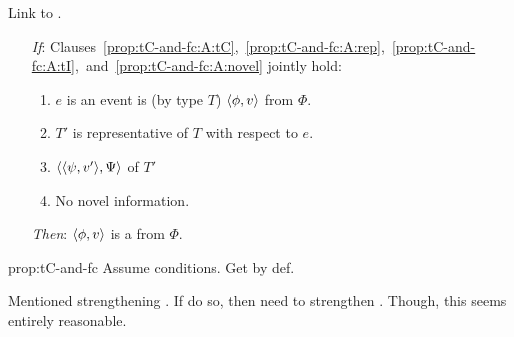 \begin{note}
  Link \tC{} to .

  \begin{proposition}[\tC{2} and \fc{1}]
    \label{prop:tC-and-fc}

    \noindent%

    \begin{itemize}
    \item[\emph{If}:]
      Clauses~\ref{prop:tC-and-fc:A:tC},~\ref{prop:tC-and-fc:A:rep},~\ref{prop:tC-and-fc:A:tI},~and~\ref{prop:tC-and-fc:A:novel} jointly hold:
      \begin{enumerate}[label=\arabic*., ref=(\arabic*)]
      \item
        \label{prop:tC-and-fc:A:tC}
        \(e\) is an event \vAgent{} is \tCV{} (by type \(T\)) \(\langle \phi, v \rangle\) from \(\Phi\).
      \item
        \label{prop:tC-and-fc:A:rep}
        \(T'\) is representative of \(T\) with respect to \(e\).
      \item
        \label{prop:tC-and-fc:A:tI}
        \(\langle \langle \psi, v' \rangle, \Psi \rangle\) \tI{} of \(T'\)
      \item
        \label{prop:tC-and-fc:A:novel}
        No novel information.
      \end{enumerate}
    \item[\emph{Then}:]
      \(\langle \phi, v \rangle\) is a \fc{} from \(\Phi\).
    \end{itemize}
    \vspace{-\baselineskip}
  \end{proposition}

  \begin{argument}{prop:tC-and-fc}
    Assume conditions.
    Get \fc{} by def.
  \end{argument}

  Mentioned strengthening .
  If do so, then need to strengthen \tC{}.
  Though, this seems entirely reasonable.
\end{note}


